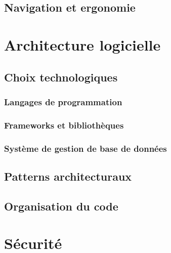 
\subsection{Navigation et ergonomie}


\section{Architecture logicielle}


\subsection{Choix technologiques}


\subsubsection{Langages de programmation}


\subsubsection{Frameworks et bibliothèques}


\subsubsection{Système de gestion de base de données}


\subsection{Patterns architecturaux}


\subsection{Organisation du code}


\section{Sécurité}

